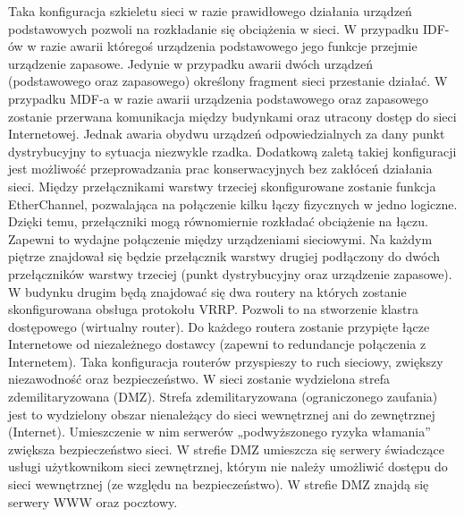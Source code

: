 \documentclass[12pt,a4paper,titlepage]{article}
\begin{document}
Taka konfiguracja szkieletu sieci w razie prawidłowego działania urządzeń podstawowych pozwoli na rozkładanie się obciążenia w sieci. W przypadku IDF-ów w razie awarii któregoś urządzenia podstawowego jego funkcje przejmie urządzenie zapasowe. Jedynie w przypadku awarii dwóch urządzeń (podstawowego oraz zapasowego) określony fragment sieci przestanie działać. W przypadku MDF-a w razie awarii urządzenia podstawowego oraz zapasowego zostanie przerwana komunikacja między budynkami oraz utracony dostęp do sieci Internetowej. Jednak awaria obydwu urządzeń odpowiedzialnych za dany punkt dystrybucyjny to sytuacja niezwykle rzadka. Dodatkową zaletą takiej konfiguracji jest możliwość przeprowadzania prac konserwacyjnych bez zakłóceń działania sieci. Między przełącznikami warstwy trzeciej skonfigurowane zostanie funkcja EtherChannel, pozwalająca na połączenie kilku łączy fizycznych w jedno logiczne. Dzięki temu, przełączniki mogą równomiernie rozkładać obciążenie na łączu. Zapewni to wydajne połączenie między urządzeniami sieciowymi. Na każdym piętrze znajdował się będzie przełącznik warstwy drugiej podłączony do dwóch przełączników warstwy trzeciej (punkt dystrybucyjny oraz urządzenie zapasowe). W budynku drugim będą znajdować się dwa routery na których zostanie skonfigurowana obsługa protokołu VRRP. Pozwoli to na stworzenie klastra dostępowego (wirtualny router). Do każdego routera zostanie przypięte łącze Internetowe od niezależnego dostawcy (zapewni to redundancje połączenia z Internetem). Taka konfiguracja routerów przyspieszy to ruch sieciowy, zwiększy niezawodność oraz bezpieczeństwo. W sieci zostanie wydzielona strefa zdemilitaryzowana (DMZ). Strefa zdemilitaryzowana (ograniczonego zaufania) jest to wydzielony obszar nienależący do sieci wewnętrznej ani do zewnętrznej (Internet). Umieszczenie w nim serwerów „podwyższonego ryzyka włamania” zwiększa bezpieczeństwo sieci. W strefie DMZ umieszcza się serwery świadczące usługi użytkownikom sieci zewnętrznej, którym nie należy umożliwić dostępu do sieci wewnętrznej (ze względu na bezpieczeństwo). W strefie DMZ znajdą się serwery WWW oraz pocztowy.
\end{document}
